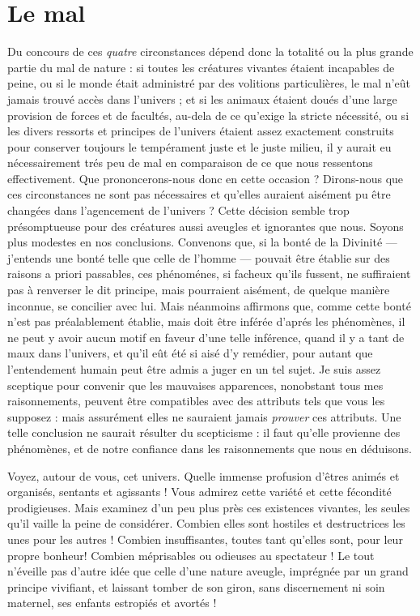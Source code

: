 
\section{Le mal}
Du concours de ces {\it quatre} circonstances dépend donc la
totalité ou la plus grande partie du mal de nature : si
toutes les créatures vivantes étaient incapables de peine,
ou si le monde était administré par des volitions particulières,
le mal n’eût jamais trouvé accès dans l’univers ;
et si les animaux étaient doués d’une large provision de
forces et de facultés, au-dela de ce qu’exige la stricte
nécessité, ou si les divers ressorts et principes de l’univers
étaient assez exactement construits pour conserver toujours
le tempérament juste et le juste milieu, il y aurait
eu nécessairement trés peu de mal en comparaison de ce
que nous ressentons effectivement. Que prononcerons-nous donc
en cette occasion ? Dirons-nous que ces circonstances
ne sont pas nécessaires et qu’elles auraient
aisément pu être changées dans l’agencement de l’univers ?
Cette décision semble trop présomptueuse pour des
créatures aussi aveugles et ignorantes que nous. Soyons
plus modestes en nos conclusions. Convenons que, si la
bonté de la Divinité — j’entends une bonté telle que
celle de l’homme — pouvait être établie sur des raisons
a priori passables, ces phénoménes, si facheux qu’ils
fussent, ne suffiraient pas à renverser le dit principe,
mais pourraient aisément, de quelque manière inconnue,
se concilier avec lui. Mais néanmoins affirmons que, comme
cette bonté n’est pas préalablement établie, mais doit
être inférée d’aprés les phénomènes, il ne peut y avoir
aucun motif en faveur d’une telle inférence, quand il y a
tant de maux dans l’univers, et qu’il eût été si aisé d’y
remédier, pour autant que l’entendement humain peut
être admis a juger en un tel sujet. Je suis assez sceptique
pour convenir que les mauvaises apparences, nonobstant
tous mes raisonnements, peuvent être compatibles avec
des attributs tels que vous les supposez : mais assurément
elles ne sauraient jamais {\it prouver} ces attributs. Une telle
conclusion ne saurait résulter du scepticisme : il faut
qu’elle provienne des phénomènes, et de notre confiance
dans les raisonnements que nous en déduisons.

Voyez, autour de vous, cet univers. Quelle immense
profusion d’êtres animés et organisés, sentants et agissants !
Vous admirez cette variété et cette fécondité
prodigieuses. Mais examinez d’un peu plus près ces existences
vivantes, les seules qu’il vaille la peine de considérer.
Combien elles sont hostiles et destructrices les unes
pour les autres ! Combien insuffisantes, toutes tant qu’elles
sont, pour leur propre bonheur! Combien méprisables ou
odieuses au spectateur ! Le tout n’éveille pas d’autre idée
que celle d’une nature aveugle, imprégnée par un grand
principe vivifiant, et laissant tomber de son giron, sans
discernement ni soin maternel, ses enfants estropiés et
avortés !


